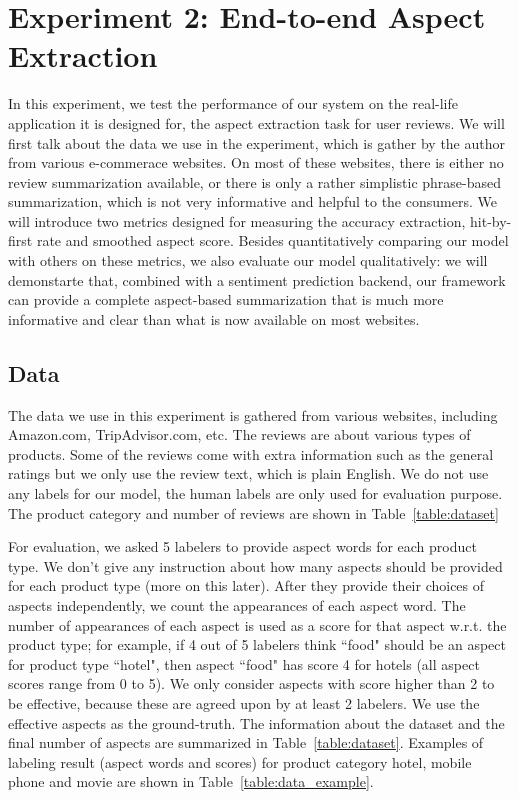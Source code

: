 \section{Experiment 2: End-to-end Aspect Extraction}

In this experiment, we test the performance of our system on the real-life application it is designed for, the aspect extraction task for user reviews. We will first talk about the data we use in the experiment, which is gather by the author from various e-commerace websites. On most of these websites, there is either no review summarization available, or there is only a rather simplistic phrase-based summarization, which is not very informative and helpful to the consumers. We will introduce two metrics designed for measuring the accuracy extraction, hit-by-first rate and smoothed aspect score. Besides quantitatively comparing our model with others on these metrics, we also evaluate our model qualitatively: we will demonstarte that, combined with a sentiment prediction backend, our framework can provide a complete aspect-based summarization that is much more informative and clear than what is now available on most websites.

\subsection{Data}

The data we use in this experiment is gathered from various websites, including Amazon.com, TripAdvisor.com, etc. The reviews are about various types of products. Some of the reviews come with extra information such as the general ratings but we only use the review text, which is plain English. We do not use any labels for our model, the human labels are only used for evaluation purpose. The product category and number of reviews are shown in Table~\ref{table:dataset}

For evaluation, we asked 5 labelers to provide aspect words for each product type. We don't give any instruction about how many aspects should be provided for each product type (more on this later). After they provide their choices of aspects independently, we count the appearances of each aspect word. The number of appearances of each aspect is used as a score for that aspect w.r.t. the product type; for example, if 4 out of 5 labelers think ``food" should be an aspect for product type ``hotel", then aspect ``food" has score 4 for hotels (all aspect scores range from 0 to 5). We only consider aspects with score higher than 2 to be effective, because these are agreed upon by at least 2 labelers. We use the effective aspects as the ground-truth. The information about the dataset and the final number of aspects are summarized in Table~\ref{table:dataset}. Examples of labeling result (aspect words and scores) for product category hotel, mobile phone and movie are shown in Table~\ref{table:data_example}.

